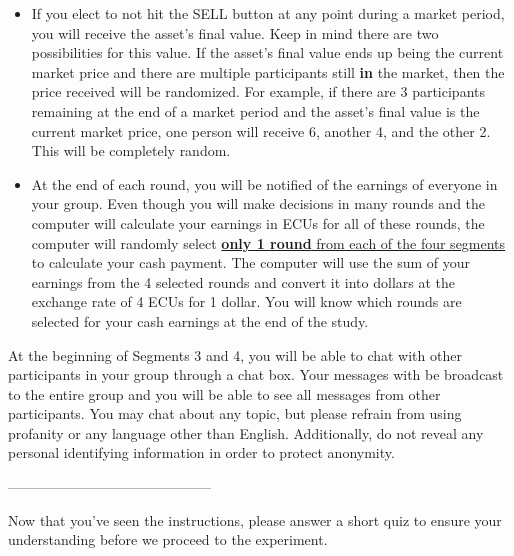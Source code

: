 \documentclass[11pt]{article}
\begin{document}
\begin{itemize}
    \item If you elect to not hit the SELL button at any point during a market period, you will receive the asset's final value. Keep in mind there are two possibilities for this value. If the asset's final value ends up being the current market price and there are multiple participants still \textbf{in} the market, then the price received will be randomized. For example, if there are 3 participants remaining at the end of a market period and the asset's final value is the current market price, one person will receive 6, another 4, and the other 2. This will be completely random.

    \item At the end of each round, you will be notified of the earnings of everyone in your group.  Even though you will make decisions in many rounds and the computer will calculate your earnings in ECUs for all of these rounds, the computer will randomly select \underline{\textbf{only 1 round} from each of the four segments} to calculate your cash payment. The computer will use the sum of your earnings from the 4 selected rounds and convert it into dollars at the exchange rate of 4 ECUs for 1 dollar. You will know which rounds are selected for your cash earnings at the end of the study.
    
\end{itemize}




At the beginning of Segments 3 and 4, you will be able to chat with other participants in your group through a chat box.  Your messages with be broadcast to the entire group and you will be able to see all messages from other participants. You may chat about any topic, but please refrain from using profanity or any language other than English. Additionally, do not reveal any personal identifying information in order to protect anonymity. 


\vspace{0.2in}
\begin{center}
--------------------------------------------
\end{center}
\vspace{0.2in}


Now that you've seen the instructions, please answer a short quiz to ensure your understanding before we proceed to the experiment.
\end{document}
